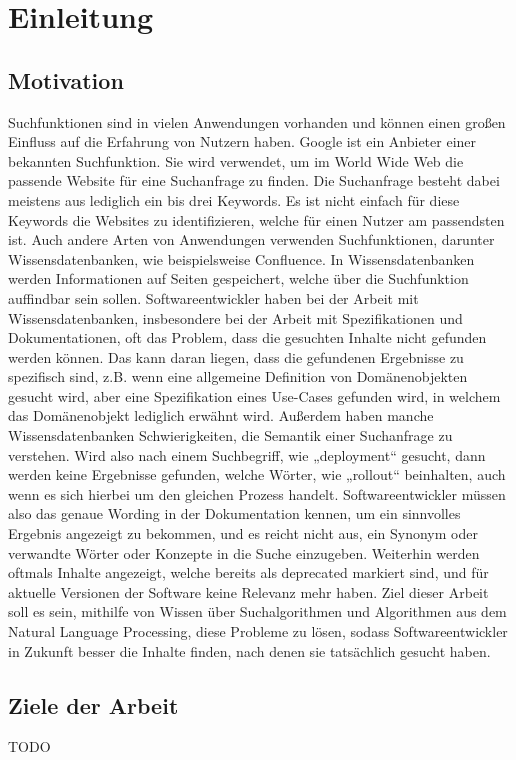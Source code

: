 %
%
%
\chapter{Einleitung}
\label{chap:intro}

%
%
%
\section{Motivation}
Suchfunktionen sind in vielen Anwendungen vorhanden und können einen großen Einfluss auf die Erfahrung von Nutzern haben. Google ist ein Anbieter einer bekannten Suchfunktion. Sie wird verwendet, um im World Wide Web die passende Website für eine Suchanfrage zu finden. Die Suchanfrage besteht dabei meistens aus lediglich ein bis drei Keywords. Es ist nicht einfach für diese Keywords die Websites zu identifizieren, welche für einen Nutzer am passendsten ist. Auch andere Arten von Anwendungen verwenden Suchfunktionen, darunter Wissensdatenbanken, wie beispielsweise Confluence. In Wissensdatenbanken werden Informationen auf Seiten gespeichert, welche über die Suchfunktion auffindbar sein sollen.
Softwareentwickler haben bei der Arbeit mit Wissensdatenbanken, insbesondere bei der Arbeit mit Spezifikationen und Dokumentationen, oft das Problem, dass die gesuchten Inhalte nicht gefunden werden können. Das kann daran liegen, dass die gefundenen Ergebnisse zu spezifisch sind, z.B. wenn eine allgemeine Definition von Domänenobjekten gesucht wird, aber eine Spezifikation eines Use-Cases gefunden wird, in welchem das Domänenobjekt lediglich erwähnt wird. Außerdem haben manche Wissensdatenbanken Schwierigkeiten, die Semantik einer Suchanfrage zu verstehen. Wird also nach einem Suchbegriff, wie „deployment“ gesucht, dann werden keine Ergebnisse gefunden, welche Wörter, wie „rollout“ beinhalten, auch wenn es sich hierbei um den gleichen Prozess handelt. Softwareentwickler müssen also das genaue Wording in der Dokumentation kennen, um ein sinnvolles Ergebnis angezeigt zu bekommen, und es reicht nicht aus, ein Synonym oder verwandte Wörter oder Konzepte in die Suche einzugeben. Weiterhin werden oftmals Inhalte angezeigt, welche bereits als deprecated markiert sind, und für aktuelle Versionen der Software keine Relevanz mehr haben. 
Ziel dieser Arbeit soll es sein, mithilfe von Wissen über Suchalgorithmen und Algorithmen aus dem Natural Language Processing, diese Probleme zu lösen, sodass Softwareentwickler in Zukunft besser die Inhalte finden, nach denen sie tatsächlich gesucht haben.

%
%
%
\section{Ziele der Arbeit}
TODO

